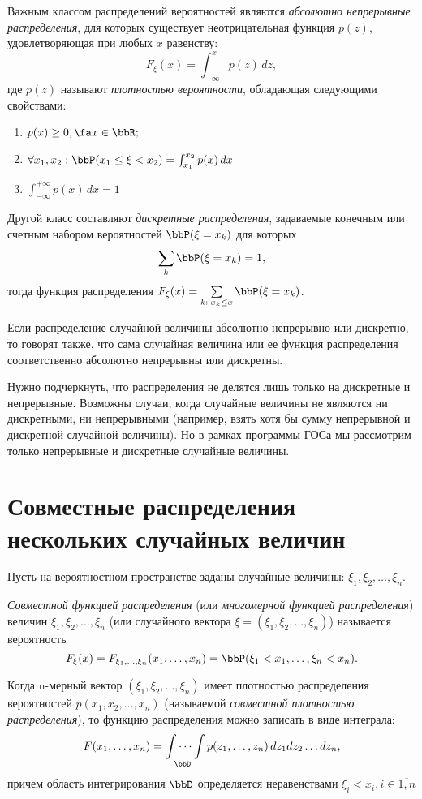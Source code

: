 Важным классом распределений вероятностей являются \textit{абсолютно непрерывные распределения}, для которых существует неотрицательная функция $p(z)$, удовлетворяющая при любых $x$ равенству:
$$F_\xi(x)=\int_{-\infty}^{x}p(z)\,dz,$$ где $p(z)$ называют \textit{плотностью вероятности}, обладающая следующими свойствами:
\begin{enumerate}
\item 
$p(x)\ge 0, \fa x \in \bbR;$ 
\item 
$\forall x_1,x_2: \bbP(x_1\le\xi<x_2)=\int_{x_1}^{x_2}p(x)\,dx$
\item
$\int_{-\infty}^{+\infty}p(x)\,dx=1$
\end{enumerate}

Другой класс составляют \textit{дискретные распределения}, задаваемые конечным или счетным набором вероятностей $\bbP(\xi = x_k)$ для которых
$$
\sum\limits_k \bbP(\xi=x_k)=1,
$$
тогда функция распределения $F_\xi(x)=\sum\limits_{k:\; x_k \le x} \bbP(\xi=x_k)$.

Если распределение случайной величины абсолютно непрерывно или дискретно, то говорят также, что сама случайная величина или ее функция распределения соответственно абсолютно непрерывны или дискретны.

Нужно подчеркнуть, что распределения не делятся лишь только на дискретные и непрерывные. Возможны случаи, когда случайные величины не являются ни дискретными, ни непрерывными (например, взять хотя бы сумму непрерывной и дискретной случайной величины). Но в рамках программы ГОСа мы рассмотрим только непрерывные и дискретные случайные величины. 

\section{Совместные распределения нескольких случайных величин}
Пусть на вероятностном пространстве заданы случайные величины: $\xi_1,\xi_2,\dots,\xi_n$.
\begin{defn}
\textit{Совместной функцией распределения} (или\textit{ многомерной функцией распределения}) величин $\xi_1,\xi_2,\dots,\xi_n$ (или случайного вектора $\xi = (\xi_1,\xi_2,\dots,\xi_n)$) называется вероятность 
$$
F_\xi(x)=F_{\xi_1,\dots,\xi_n}(x_1,\dots,x_n)=\bbP(\xi_1 < x_1,\dots,\xi_n<x_n).
$$
\end{defn}

Когда n-мерный вектор $(\xi_1,\xi_2,\dots,\xi_n)$ имеет плотностью распределения вероятностей $p(x_1,x_2,\dots,x_n)$ (называемой \textit{совместной плотностью распределения}), то функцию распределения можно записать в виде интеграла:
$$
F(x_1,\dots,x_n)=\idotsint\limits_\bbD p(z_1,\dots,z_n)\,dz_1dz_2\dots dz_n,
$$
причем область интегрирования $\bbD$ определяется неравенствами $\xi_i<x_i, i\in \overline{1,n}$

